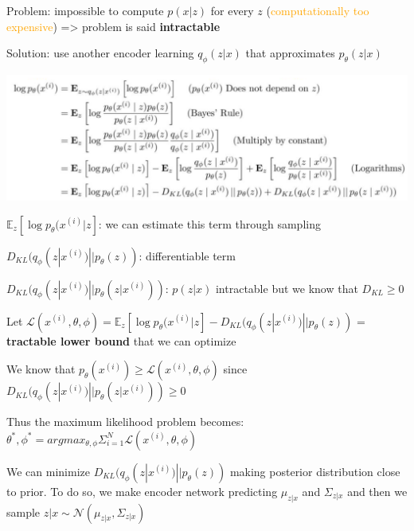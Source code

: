 \vspace{5mm}

Problem: impossible to compute $p(x|z)$ for every $z$ (\textcolor{orange}{computationally too expensive}) => problem is said \textbf{intractable}

\vspace{5mm}

Solution: use another encoder learning $q_\phi (z|x)$ that approximates $p_\theta(z | x)$

\begin{center}
\includegraphics[scale=0.4]{log-likelihood-VAE.png}
\end{center}

\vspace{5mm}

$\mathbb{E}_z[\log p_\theta (x^{(i)} | z]$: we can estimate this term through sampling

$D_{KL}(q_\phi(z | x^{(i)}) || p_\theta(z))$: differentiable term

$D_{KL}(q_\phi(z | x^{(i)}) || p_\theta(z | x^{(i)}))$: $p(z|x)$ intractable but we know that $D_{KL} \geq 0$

\vspace{5mm}

Let $\mathcal{L}(x^{(i)}, \theta, \phi) = \mathbb{E}_z[\log p_\theta (x^{(i)} | z] - D_{KL}(q_\phi(z | x^{(i)}) || p_\theta(z))$ = \textbf{tractable lower bound} that we can optimize

\vspace{5mm}

We know that $p_\theta (x^{(i)}) \geq \mathcal{L}(x^{(i)}, \theta, \phi)$ since $D_{KL}(q_\phi(z | x^{(i)}) || p_\theta(z | x^{(i)})) \geq 0$

Thus the maximum likelihood problem becomes: $\theta^*, \phi^* = argmax_{\theta, \phi} \Sigma_{i=1}^N \mathcal{L}(x^{(i)}, \theta, \phi)$

\vspace{5mm}

We can minimize $D_{KL}(q_\phi(z | x^{(i)}) || p_\theta(z))$ making posterior distribution close to prior. To do so, we make encoder network predicting $\mu_{z | x}$ and $\Sigma_{z | x}$ and then we sample $z | x \sim \mathcal{N}(\mu_{z | x}, \Sigma_{z | x})$

